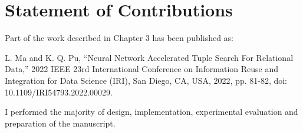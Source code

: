 \chapter*{Statement of Contributions}

Part of the work described in Chapter 3 has been published as:
\newline

\noindent L. Ma and K. Q. Pu, ``Neural Network Accelerated Tuple Search For Relational Data,'' 2022 IEEE 23rd International Conference on Information Reuse and Integration for Data Science (IRI), San Diego, CA, USA, 2022, pp. 81-82, doi: 10.1109/IRI54793.2022.00029.
\newline

I performed the majority of design, implementation, experimental evaluation and preparation of the manuscript.
